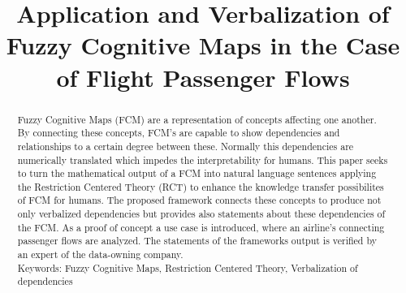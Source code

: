 \documentclass[conference]{IEEEtran}
\begin{document}
\title{Application and Verbalization of Fuzzy Cognitive Maps in the Case of Flight Passenger Flows}

\author{
\and
{}
\and
{}
}

\maketitle

\begin{abstract}
Fuzzy Cognitive Maps (FCM) are a representation of concepts affecting one another. By connecting these concepts, FCM's are capable to show dependencies and relationships to a certain degree between these.  Normally this dependencies are numerically translated which impedes the interpretability for humans. This paper seeks to turn the mathematical output of a FCM into natural language sentences applying the Restriction Centered Theory (RCT) to enhance the knowledge transfer possibilites of FCM for humans. The proposed framework connects these concepts to produce not only verbalized dependencies but provides also statements about these dependencies of the FCM. As a proof of concept a use case is introduced, where an airline's connecting passenger flows are analyzed. The statements of the frameworks output is verified by an expert of the data-owning company.\\
Keywords: Fuzzy Cognitive Maps, Restriction Centered Theory, Verbalization of dependencies
\end{abstract}

	
\IEEEpeerreviewmaketitle
\end{document}
